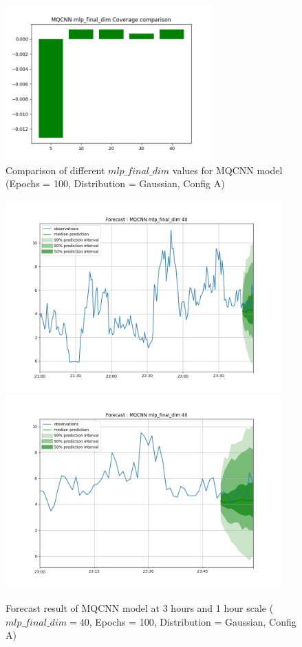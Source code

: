 \begin{figure}[H]
    \centering
    \includegraphics[width=300px]{plots/hist/a/MQCNN/mlp_final_dim/Coverage.png}
    \caption{Comparison of different $mlp\_final\_dim$ values for MQCNN model (Epochs = 100, Distribution = Gaussian, Config A)}
    \label{fig:comp_mqcnn}
\end{figure}

\begin{figure}[H]
    \centering
    \includegraphics[width=400px]{plots/forecast/a/MQCNN/mlp_final_dim/40/180.png}
    \includegraphics[width=400px]{plots/forecast/a/MQCNN/mlp_final_dim/40/60.png}
    \caption{Forecast result of MQCNN model at 3 hours and 1 hour scale ($mlp\_final\_dim = 40 $, Epochs = 100, Distribution = Gaussian, Config A)}
    \label{fig:mqcnn}
\end{figure}

